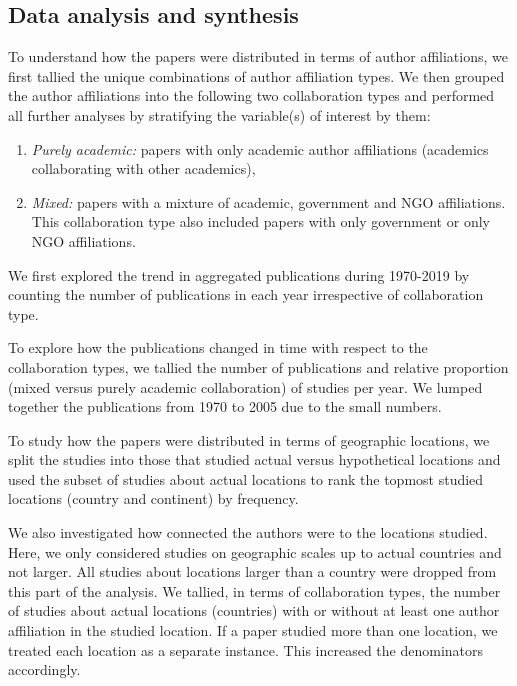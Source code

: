 \documentclass[10pt,letterpaper]{article}
\begin{document}
\subsection*{Data analysis and synthesis}
To understand how the papers were distributed in terms of author affiliations, we first tallied the unique combinations of author affiliation types. We then grouped the author affiliations into the following two collaboration types and performed all further analyses by stratifying the variable(s) of interest by them:

\begin{enumerate}
	\item \textit{Purely academic:} papers with only academic author affiliations (academics collaborating with other academics), 
	\item \textit{Mixed:} papers with a mixture of academic, government and NGO affiliations. This collaboration type also included papers with only government or only NGO affiliations. 
\end{enumerate}

We first explored the trend in aggregated publications during 1970-2019 by counting the number of publications in each year irrespective of collaboration type. 

To explore how the publications changed in time with respect to the collaboration types, we tallied the number of publications and relative proportion (mixed versus purely academic collaboration) of studies per year. We lumped together the publications from 1970 to 2005 due to the small numbers. 

To study how the papers were distributed in terms of geographic locations, we split the studies into those that studied actual versus hypothetical locations and used the subset of studies about actual locations to rank the topmost studied locations (country and continent) by frequency. 

We also investigated how connected the authors were to the locations studied. Here, we only considered studies on geographic scales up to actual countries and not larger. All studies about locations larger than a country were dropped from this part of the analysis. We tallied, in terms of collaboration types, the number of studies about actual locations (countries) with or without at least one author affiliation in the studied location. If a paper studied more than one location, we treated each location as a separate instance. This increased the denominators accordingly. 
\end{document}
